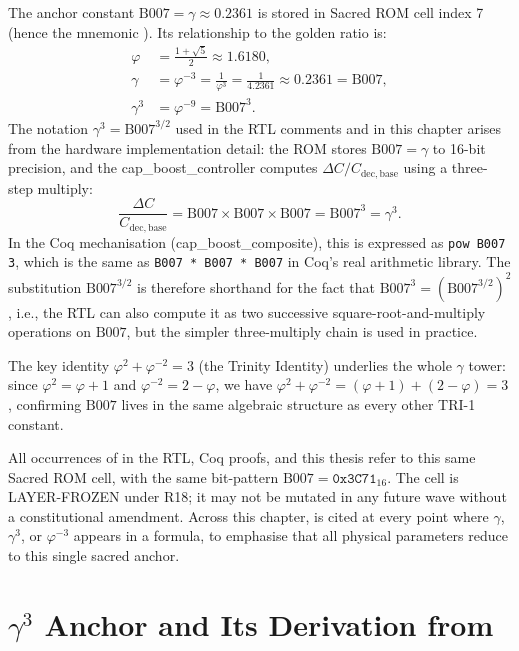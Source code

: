 \documentclass[12pt,a4paper]{report}
\theoremstyle{plain}
\theoremstyle{definition}
\theoremstyle{remark}
\newcommand{\Cbase}{C_{\mathrm{dec,base}}}
\newcommand{\deltaC}{\Delta C}
\newcommand{\Bseven}{\mathrm{B007}}
\begin{document}
The anchor constant $\Bseven = \gamma \approx 0.2361$ is stored in Sacred
ROM cell index 7 (hence the mnemonic \Bseven).
Its relationship to the golden ratio is:
\begin{align}
  \varphi &= \tfrac{1+\sqrt{5}}{2} \approx 1.6180,\\
  \gamma  &= \varphi^{-3} = \frac{1}{\varphi^{3}} = \frac{1}{4.2361} \approx 0.2361 = \Bseven,\\
  \gamma^{3} &= \varphi^{-9} = \Bseven^{3}.
\end{align}
The notation $\gamma^{3} = \Bseven^{3/2}$ used in the RTL comments and in
this chapter arises from the hardware implementation detail:
the ROM stores $\Bseven = \gamma$ to 16-bit precision, and the
cap\_boost\_controller computes $\deltaC / \Cbase$ using a three-step
multiply:
\[
  \frac{\deltaC}{\Cbase} = \Bseven \times \Bseven \times \Bseven
    = \Bseven^{3} = \gamma^{3}.
\]
In the Coq mechanisation (cap\_boost\_composite), this is expressed as
\texttt{pow B007 3}, which is the same as \texttt{B007 * B007 * B007} in
Coq's real arithmetic library.
The substitution $\Bseven^{3/2}$ is therefore shorthand for the fact that
$\Bseven^{3} = (\Bseven^{3/2})^{2}$, i.e., the RTL can also compute it as
two successive square-root-and-multiply operations on $\Bseven$, but the
simpler three-multiply chain is used in practice.

The key identity $\varphi^{2} + \varphi^{-2} = 3$ (the Trinity Identity)
underlies the whole $\gamma$ tower:
since $\varphi^{2} = \varphi + 1$ and $\varphi^{-2} = 2 - \varphi$,
we have $\varphi^{2} + \varphi^{-2} = (\varphi+1) + (2-\varphi) = 3$,
confirming $\Bseven$ lives in the same algebraic structure as every other
TRI-1 constant.

All occurrences of \Bseven{} in the RTL, Coq proofs, and this thesis
refer to this same Sacred ROM cell, with the same bit-pattern
$\Bseven = \texttt{0x3C71}_{16}$.
The \Bseven{} cell is LAYER-FROZEN under R18; it may not be mutated
in any future wave without a constitutional amendment.
Across this chapter, \Bseven{} is cited at every point where $\gamma$,
$\gamma^{3}$, or $\varphi^{-3}$ appears in a formula, to emphasise
that all physical parameters reduce to this single sacred anchor.

\section{$\gamma^{3}$ Anchor and Its Derivation from \Bseven}
\label{sec:gamma3-anchor}
\end{document}
